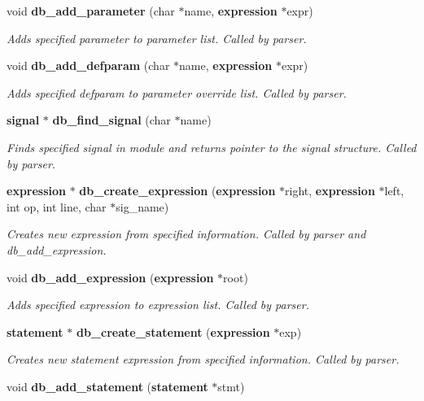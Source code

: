 \begin{CompactItemize}
void {\bf db\_\-add\_\-parameter} (char $\ast$name, {\bf expression} $\ast$expr)
\begin{CompactList}\small\item\em Adds specified parameter to parameter list. Called by parser.\item\end{CompactList}\item 
void {\bf db\_\-add\_\-defparam} (char $\ast$name, {\bf expression} $\ast$expr)
\begin{CompactList}\small\item\em Adds specified defparam to parameter override list. Called by parser.\item\end{CompactList}\item 
{\bf signal} $\ast$ {\bf db\_\-find\_\-signal} (char $\ast$name)
\begin{CompactList}\small\item\em Finds specified signal in module and returns pointer to the signal structure. Called by parser.\item\end{CompactList}\item 
{\bf expression} $\ast$ {\bf db\_\-create\_\-expression} ({\bf expression} $\ast$right, {\bf expression} $\ast$left, int op, int line, char $\ast$sig\_\-name)
\begin{CompactList}\small\item\em Creates new expression from specified information. Called by parser and db\_\-add\_\-expression.\item\end{CompactList}\item 
void {\bf db\_\-add\_\-expression} ({\bf expression} $\ast$root)
\begin{CompactList}\small\item\em Adds specified expression to expression list. Called by parser.\item\end{CompactList}\item 
{\bf statement} $\ast$ {\bf db\_\-create\_\-statement} ({\bf expression} $\ast$exp)
\begin{CompactList}\small\item\em Creates new statement expression from specified information. Called by parser.\item\end{CompactList}\item 
void {\bf db\_\-add\_\-statement} ({\bf statement} $\ast$stmt)

\end{CompactItemize}
